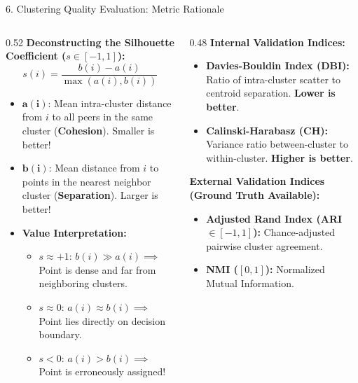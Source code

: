\documentclass[aspectratio=169,10pt]{beamer}
\begin{document}
\begin{frame}{6. Clustering Quality Evaluation: Metric Rationale}
  \footnotesize
  \begin{columns}[T]
    \begin{column}{0.52\textwidth}
      \textbf{Deconstructing the Silhouette Coefficient ($s \in [-1, 1]$):}
      $$s(i) = \frac{b(i) - a(i)}{\max(a(i), b(i))}$$
      \begin{itemize}\setlength{\itemsep}{1.5pt}
        \item $\mathbf{a(i)}$: Mean intra-cluster distance from $i$ to all peers in the same cluster (\textbf{Cohesion}). Smaller is better!
        \item $\mathbf{b(i)}$: Mean distance from $i$ to points in the nearest neighbor cluster (\textbf{Separation}). Larger is better!
        \item \textbf{Value Interpretation:}
          \begin{itemize}
            \item $s \approx +1$: $b(i) \gg a(i) \implies$ Point is dense and far from neighboring clusters.
            \item $s \approx 0$: $a(i) \approx b(i) \implies$ Point lies directly on decision boundary.
            \item $s < 0$: $a(i) > b(i) \implies$ Point is erroneously assigned!
          \end{itemize}
      \end{itemize}
    \end{column}
    \begin{column}{0.48\textwidth}
      \textbf{Internal Validation Indices:}
      \begin{itemize}\setlength{\itemsep}{2pt}
        \item \textbf{Davies-Bouldin Index (DBI):} Ratio of intra-cluster scatter to centroid separation. \textbf{Lower is better}.
        \item \textbf{Calinski-Harabasz (CH):} Variance ratio between-cluster to within-cluster. \textbf{Higher is better}.
      \end{itemize}
      \vspace{0.3em}
      \textbf{External Validation Indices (Ground Truth Available):}
      \begin{itemize}\setlength{\itemsep}{1.5pt}
        \item \textbf{Adjusted Rand Index (ARI $\in [-1, 1]$):} Chance-adjusted pairwise cluster agreement.
        \item \textbf{NMI ($[0, 1]$):} Normalized Mutual Information.
      \end{itemize}
    \end{column}
  \end{columns}
\end{frame}
\end{document}
